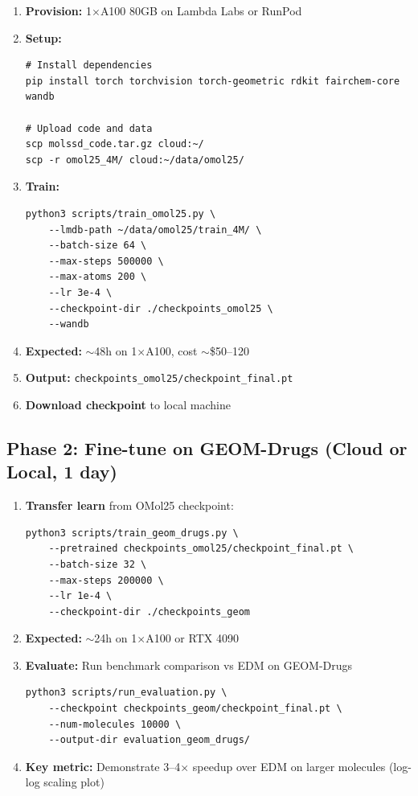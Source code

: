 \documentclass[11pt,a4paper]{article}
\begin{document}
\begin{enumerate}[nosep]
    \item \textbf{Provision:} 1$\times$A100 80GB on Lambda Labs or RunPod
    \item \textbf{Setup:}
\begin{verbatim}
# Install dependencies
pip install torch torchvision torch-geometric rdkit fairchem-core wandb

# Upload code and data
scp molssd_code.tar.gz cloud:~/
scp -r omol25_4M/ cloud:~/data/omol25/
\end{verbatim}
    \item \textbf{Train:}
\begin{verbatim}
python3 scripts/train_omol25.py \
    --lmdb-path ~/data/omol25/train_4M/ \
    --batch-size 64 \
    --max-steps 500000 \
    --max-atoms 200 \
    --lr 3e-4 \
    --checkpoint-dir ./checkpoints_omol25 \
    --wandb
\end{verbatim}
    \item \textbf{Expected:} $\sim$48h on 1$\times$A100, cost $\sim$\$50--120
    \item \textbf{Output:} \texttt{checkpoints\_omol25/checkpoint\_final.pt}
    \item \textbf{Download checkpoint} to local machine
\end{enumerate}

\subsection{Phase 2: Fine-tune on GEOM-Drugs (Cloud or Local, 1 day)}

\begin{enumerate}[nosep]
    \item \textbf{Transfer learn} from OMol25 checkpoint:
\begin{verbatim}
python3 scripts/train_geom_drugs.py \
    --pretrained checkpoints_omol25/checkpoint_final.pt \
    --batch-size 32 \
    --max-steps 200000 \
    --lr 1e-4 \
    --checkpoint-dir ./checkpoints_geom
\end{verbatim}
    \item \textbf{Expected:} $\sim$24h on 1$\times$A100 or RTX 4090
    \item \textbf{Evaluate:} Run benchmark comparison vs EDM on GEOM-Drugs
\begin{verbatim}
python3 scripts/run_evaluation.py \
    --checkpoint checkpoints_geom/checkpoint_final.pt \
    --num-molecules 10000 \
    --output-dir evaluation_geom_drugs/
\end{verbatim}
    \item \textbf{Key metric:} Demonstrate 3--4$\times$ speedup over EDM
          on larger molecules (log-log scaling plot)
\end{enumerate}
\end{document}
